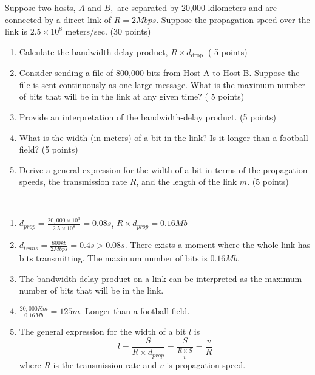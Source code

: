 \begin{exercise}[]{Suppose two hosts, $A$ and $B,$ are separated by 20,000 kilometers and are connected by a direct link of $R=2 M b p s .$ Suppose the propagation speed over the link is $2.5 \times 10^{8}$ meters/sec. (30 points)

    \begin{enumerate}
        \item Calculate the bandwidth-delay product, $R \times d_{\text {drop }}$ ( 5 points)
        \item Consider sending a file of 800,000 bits from Host A to Host B. Suppose the file is sent continuously as one large message. What is the maximum number of bits that will be in the link at any given time? ( 5 points)
        \item Provide an interpretation of the bandwidth-delay product. (5 points)
        \item What is the width (in meters) of a bit in the link? Is it longer than a football field? (5 points)
        \item Derive a general expression for the width of a bit in terms of the propagation speeds, the transmission rate $R$, and the length of the link $m$. (5 points)
    \end{enumerate}}
  \begin{solution}
  \par{~}
  \begin{enumerate}
    \item $d_{prop} = \frac{20,000 \times 10^3}{2.5 \times 10^8} = 0.08s$, $R\times d_{prop} = 0.16 Mb$
    \item $d_{trans} = \frac{800 kb}{2Mbps} = 0.4s > 0.08s$. There exists a moment where the whole link has bits transmitting. The maximum number of bits is $0.16 Mb$.
    \item The bandwidth-delay product on a link can be interpreted as the maximum number of bits that will be in the link.
    \item $\frac{20,000 Km}{0.16 Mb} = 125m$. Longer than a football field.
    \item The general expression for the width of a bit $l$ is
    \begin{equation}
      l = \frac{S}{R \times d_{prop}} = \frac{S}{\frac{R \times S}{v}} = \frac{v}{R}
    \end{equation}
    where $R$ is the transmission rate and $v$ is propagation speed.
  \end{enumerate}
  \end{solution}
  \label{ex3}
\end{exercise}



